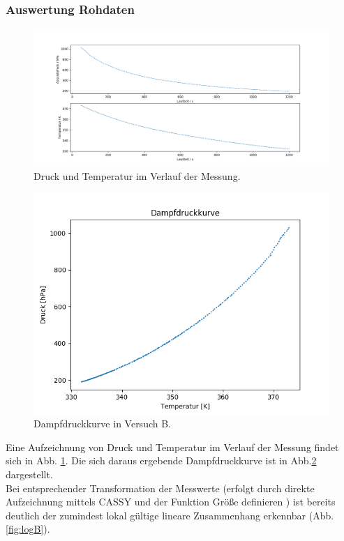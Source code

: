 \documentclass[12pt,a4paper]{article}
\begin{document}
\subsubsection{Auswertung Rohdaten}

\begin{figure}
\begin{center}
\includegraphics[scale=0.4]{Bilder/Rohdaten_HauptmessungB}
\caption[Rohdaten B]{Druck und Temperatur im Verlauf der Messung.}
\label{fig:RohdatenB}
\end{center}
\end{figure}


\begin{figure}
\begin{center}
\includegraphics[scale=0.8]{Bilder/DampfdruckkurveB}
\caption[Dampfdruckkurve B]{Dampfdruckkurve in Versuch B.}
\label{fig:DampfB}
\end{center}
\end{figure}

Eine Aufzeichnung von Druck und Temperatur im Verlauf der Messung findet sich in Abb. \ref{fig:RohdatenB}. Die sich daraus ergebende Dampfdruckkurve ist in Abb.\ref{fig:DampfB} dargestellt.\\
Bei entsprechender Transformation der Messwerte (erfolgt durch direkte Aufzeichnung mittels CASSY und der Funktion \glqq Größe definieren \grqq) ist bereits deutlich der zumindest lokal gültige lineare Zusammenhang erkennbar (Abb.\ref{fig:logB}).
\end{document}
